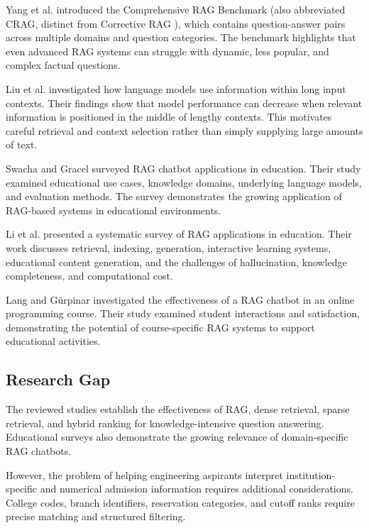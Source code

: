 \documentclass[conference]{IEEEtran}
\begin{document}
Yang et al. \cite{CRAGBenchmark2024} introduced the
Comprehensive RAG Benchmark (also abbreviated CRAG,
distinct from Corrective RAG \cite{CRAG2024}), which
contains question-answer pairs across multiple domains
and question categories. The benchmark highlights that
even advanced RAG systems can struggle with
dynamic, less popular, and complex factual questions.

Liu et al. \cite{LostMiddle2024} investigated how
language models use information within long input
contexts. Their findings show that model performance
can decrease when relevant information is positioned
in the middle of lengthy contexts. This motivates
careful retrieval and context selection rather than
simply supplying large amounts of text.

Swacha and Gracel \cite{EducationSurvey2025} surveyed
RAG chatbot applications in education. Their study
examined educational use cases, knowledge domains,
underlying language models, and evaluation methods.
The survey demonstrates the growing application of
RAG-based systems in educational environments.

Li et al. \cite{EducationalRAG2025} presented a
systematic survey of RAG applications in education.
Their work discusses retrieval, indexing, generation,
interactive learning systems, educational content
generation, and the challenges of hallucination,
knowledge completeness, and computational cost.

Lang and Gürpinar \cite{LearningSupport2025}
investigated the effectiveness of a RAG chatbot
in an online programming course. Their study
examined student interactions and satisfaction,
demonstrating the potential of course-specific
RAG systems to support educational activities.

\subsection{Research Gap}

The reviewed studies establish the effectiveness
of RAG, dense retrieval, sparse retrieval, and
hybrid ranking for knowledge-intensive question
answering. Educational surveys also demonstrate
the growing relevance of domain-specific RAG
chatbots.

However, the problem of helping engineering
aspirants interpret institution-specific and
numerical admission information requires additional
considerations. College codes, branch identifiers,
reservation categories, and cutoff ranks require
precise matching and structured filtering.
\end{document}
